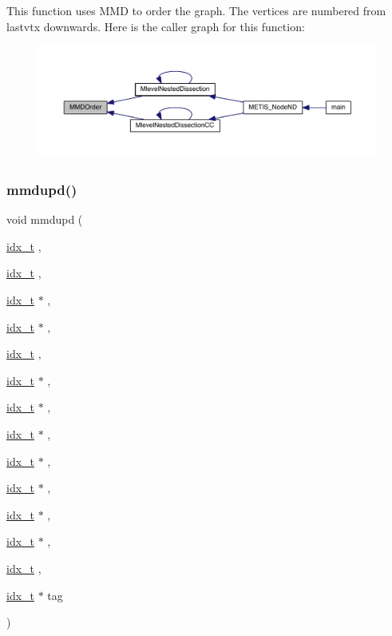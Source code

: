 This function uses M\+MD to order the graph. The vertices are numbered from lastvtx downwards. Here is the caller graph for this function\+:\nopagebreak
\begin{figure}[H]
\begin{center}
\leavevmode
\includegraphics[width=350pt]{a00945_acafb70c0e49cde8105dc62f6c34dfa6c_icgraph}
\end{center}
\end{figure}
\mbox{\label{a00945_a718418159740294aa04f16c7897231a4}} 
\subsubsection{\texorpdfstring{mmdupd()}{mmdupd()}}
{\footnotesize\ttfamily void mmdupd (\begin{DoxyParamCaption}\item[{\hyperlink{a00876_aaa5262be3e700770163401acb0150f52}{idx\+\_\+t}}]{,  }\item[{\hyperlink{a00876_aaa5262be3e700770163401acb0150f52}{idx\+\_\+t}}]{,  }\item[{\hyperlink{a00876_aaa5262be3e700770163401acb0150f52}{idx\+\_\+t} $\ast$}]{,  }\item[{\hyperlink{a00876_aaa5262be3e700770163401acb0150f52}{idx\+\_\+t} $\ast$}]{,  }\item[{\hyperlink{a00876_aaa5262be3e700770163401acb0150f52}{idx\+\_\+t}}]{,  }\item[{\hyperlink{a00876_aaa5262be3e700770163401acb0150f52}{idx\+\_\+t} $\ast$}]{,  }\item[{\hyperlink{a00876_aaa5262be3e700770163401acb0150f52}{idx\+\_\+t} $\ast$}]{,  }\item[{\hyperlink{a00876_aaa5262be3e700770163401acb0150f52}{idx\+\_\+t} $\ast$}]{,  }\item[{\hyperlink{a00876_aaa5262be3e700770163401acb0150f52}{idx\+\_\+t} $\ast$}]{,  }\item[{\hyperlink{a00876_aaa5262be3e700770163401acb0150f52}{idx\+\_\+t} $\ast$}]{,  }\item[{\hyperlink{a00876_aaa5262be3e700770163401acb0150f52}{idx\+\_\+t} $\ast$}]{,  }\item[{\hyperlink{a00876_aaa5262be3e700770163401acb0150f52}{idx\+\_\+t} $\ast$}]{,  }\item[{\hyperlink{a00876_aaa5262be3e700770163401acb0150f52}{idx\+\_\+t}}]{,  }\item[{\hyperlink{a00876_aaa5262be3e700770163401acb0150f52}{idx\+\_\+t} $\ast$}]{tag }\end{DoxyParamCaption})}

